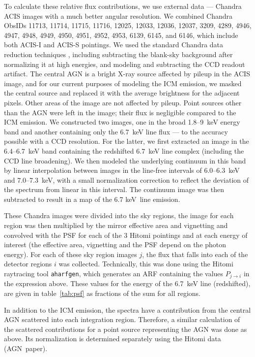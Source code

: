 To calculate these relative flux contributions, we use external data --- Chandra ACIS images with a much better angular resolution. We combined Chandra ObsIDs 11713, 11714, 11715, 11716, 12025, 12033, 12036, 12037, 3209, 4289, 4946, 4947, 4948, 4949, 4950, 4951, 4952, 4953, 6139, 6145, and 6146, which include both ACIS-I and ACIS-S pointings. We used the standard Chandra data reduction techniques \citep[see, e.g.,][for details]{wang16}, including subtracting the blank-sky background after normalizing it at high energies, and modeling and subtracting the CCD readout artifact. The central AGN is a bright X-ray source affected by pileup in the ACIS image, and for our current purposes of modeling the ICM emission, we masked the central source and replaced it with the average brightness for the adjacent pixels. Other areas of the image are not affected by pileup. Point sources other than the AGN were left in the image; their flux is negligible compared to the ICM emission. We constructed two images, one in the broad 1.8--9~keV energy band and another containing only the 6.7~keV line flux --- to the accuracy possible with a CCD resolution. For the latter, we first extracted an image in the 6.4--6.7~keV band containing the redshifted 6.7~keV line complex (including the CCD line broadening). We then modeled the underlying continuum in this band by linear interpolation between images in the line-free intervals of 6.0--6.3~keV and 7.0--7.3~keV, with a small normalization correction to reflect the deviation of the spectrum from linear in this interval. The continuum image was then subtracted to result in a map of the 6.7 keV~line emission.

These Chandra images were divided into the sky regions, the image for each region was then multiplied by the mirror effective area and vignetting and convolved with the PSF for each of the 3 Hitomi pointings and at each energy of interest (the effective area, vignetting and the PSF depend on the photon energy). For each of these sky region images $j$, the flux that falls into each of the detector regions $i$\/ was collected. Technically, this was done using the Hitomi raytracing tool \verb+aharfgen+, which generates an ARF containing the values $P_{j\rightarrow i}$ in the expression above. These values for the energy of the 6.7~keV line (redshifted), are given in table~\ref{tab:psf} as fractions of the sum for all regions.

In addition to the ICM emission, the spectra have a contribution from the central AGN scattered into each integration region. Therefore, a similar calculation of the scattered contributions for a point source representing the AGN was done as above. Its normalization is determined separately using the Hitomi data (AGN~paper).

